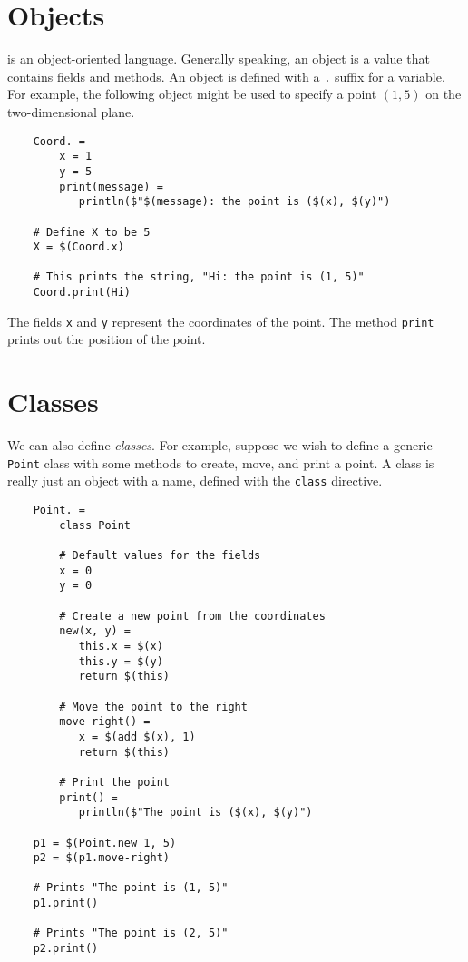 %
\section{Objects}
\label{section:objects}

\OMake{} is an object-oriented language.  Generally speaking, an object is a value that contains fields
and methods.  An object is defined with a \verb+.+ suffix for a variable.  For example, the
following object might be used to specify a point $(1, 5)$ on the two-dimensional plane.

\begin{verbatim}
    Coord. =
        x = 1
        y = 5
        print(message) =
           println($"$(message): the point is ($(x), $(y)")

    # Define X to be 5
    X = $(Coord.x)

    # This prints the string, "Hi: the point is (1, 5)"
    Coord.print(Hi)
\end{verbatim}

The fields \verb+x+ and \verb+y+ represent the coordinates of the point.  The method \verb+print+
prints out the position of the point.

\section{Classes}

We can also define \emph{classes}.  For example, suppose we wish to define a generic \verb+Point+
class with some methods to create, move, and print a point.  A class is really just an object with
a name, defined with the \verb+class+ directive.

\begin{verbatim}
    Point. =
        class Point

        # Default values for the fields
        x = 0
        y = 0

        # Create a new point from the coordinates
        new(x, y) =
           this.x = $(x)
           this.y = $(y)
           return $(this)

        # Move the point to the right
        move-right() =
           x = $(add $(x), 1)
           return $(this)

        # Print the point
        print() =
           println($"The point is ($(x), $(y)")

    p1 = $(Point.new 1, 5)
    p2 = $(p1.move-right)

    # Prints "The point is (1, 5)"
    p1.print()

    # Prints "The point is (2, 5)"
    p2.print()
\end{verbatim}

